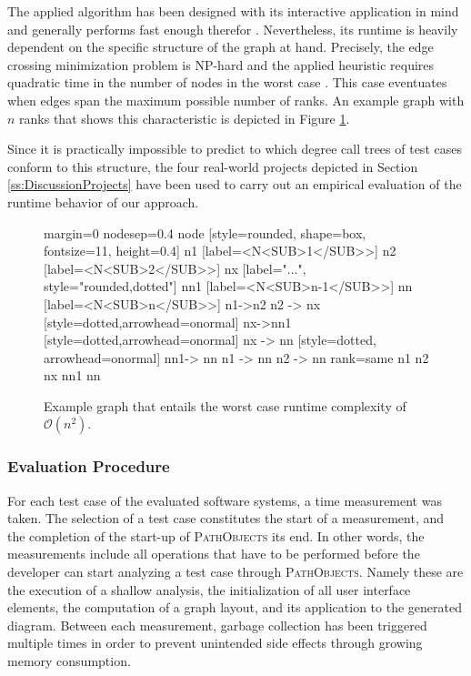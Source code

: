 The applied algorithm has been designed with its interactive application in mind and generally performs fast enough therefor \cite{gansner_technique_1993}.
Nevertheless, its runtime is heavily dependent on the specific structure of the graph at hand.
Precisely, the edge crossing minimization problem is NP-hard and the applied heuristic requires quadratic time in the number of nodes in the worst case \cite{tamassia_handbook_2013}.
This case eventuates when edges span the maximum possible number of ranks.
An example graph with $n$ ranks that shows this characteristic is depicted in Figure \ref{fig:graph-worst-case}.

Since it is practically impossible to predict to which degree call trees of test cases conform to this structure, the four real-world projects depicted in Section \ref{ss:DiscussionProjects} have been used to carry out an empirical evaluation of the runtime behavior of our approach.

\begin{figure}[b]
	\centering	
	{
		margin=0
		nodesep=0.4
		node [style=rounded, shape=box, fontsize=11, height=0.4]
		n1 [label=<N<SUB>1</SUB>>]
		n2 [label=<N<SUB>2</SUB>>]
		nx [label="...", style="rounded,dotted"]
		nn1 [label=<N<SUB>n-1</SUB>>]
		nn [label=<N<SUB>n</SUB>>]
		n1->n2
		n2 -> nx [style=dotted,arrowhead=onormal]
		nx->nn1 [style=dotted,arrowhead=onormal]
		nx -> nn [style=dotted, arrowhead=onormal]
		nn1-> nn
		n1 -> nn
		n2 -> nn
		{rank=same n1 n2 nx nn1 nn}
	}
	\caption[Example Graph that Entails Worst Case Runtime Complexity]{Example graph that entails the worst case runtime complexity of $\mathcal O(n^2)$.}
	\label{fig:graph-worst-case}
\end{figure}

\subsubsection{Evaluation Procedure}
For each test case of the evaluated software systems, a time measurement was taken.
The selection of a test case constitutes the start of a measurement, and the completion of the start-up of \textsc{PathObjects} its end.
In other words, the measurements include all operations that have to be performed before the developer can start analyzing a test case through \textsc{PathObjects}.
Namely these are the execution of a shallow analysis, the initialization of all user interface elements, the computation of a graph layout, and its application to the generated diagram.
Between each measurement, garbage collection has been triggered multiple times in order to prevent unintended side effects through growing memory consumption.

